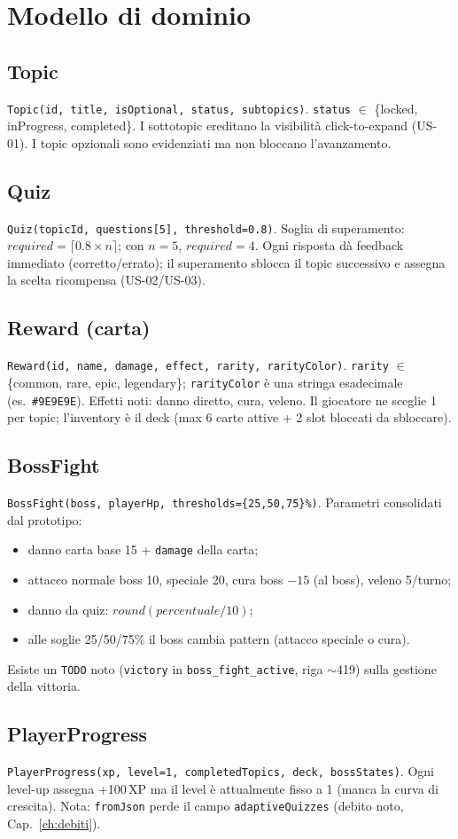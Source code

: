 \chapter{Modello di dominio}
\label{ch:dominio}

\section{Topic}
\texttt{Topic(id, title, isOptional, status, subtopics)}.
\texttt{status} $\in$ \{locked, inProgress, completed\}. I sottotopic ereditano
la visibilità click-to-expand (US-01). I topic opzionali sono evidenziati ma
non bloccano l'avanzamento.

\section{Quiz}
\texttt{Quiz(topicId, questions[5], threshold=0.8)}.
Soglia di superamento: $required = \lceil 0.8 \times n \rceil$; con $n=5$,
$required = 4$. Ogni risposta dà feedback immediato (corretto/errato);
il superamento sblocca il topic successivo e assegna la scelta ricompensa
(US-02/US-03).

\section{Reward (carta)}
\texttt{Reward(id, name, damage, effect, rarity, rarityColor)}.
\texttt{rarity} $\in$ \{common, rare, epic, legendary\}; \texttt{rarityColor}
è una stringa esadecimale (es.\ \texttt{\#9E9E9E}). Effetti noti: danno
diretto, cura, veleno. Il giocatore ne sceglie 1 per topic; l'inventory
è il deck (max 6 carte attive + 2 slot bloccati da sbloccare).

\section{BossFight}
\texttt{BossFight(boss, playerHp, thresholds=\{25,50,75\}\%)}.
Parametri consolidati dal prototipo:
\begin{itemize}[nosep]
\item danno carta base 15 + \texttt{damage} della carta;
\item attacco normale boss 10, speciale 20, cura boss $-15$ (al boss),
veleno 5/turno;
\item danno da quiz: $\mathit{round}(\mathit{percentuale}/10)$;
\item alle soglie 25/50/75\% il boss cambia pattern (attacco speciale o cura).
\end{itemize}
Esiste un \texttt{TODO} noto (\texttt{victory} in \texttt{boss\_fight\_active},
riga $\sim$419) sulla gestione della vittoria.

\section{PlayerProgress}
\texttt{PlayerProgress(xp, level=1, completedTopics, deck, bossStates)}.
Ogni level-up assegna +100\,XP ma il level è attualmente fisso a 1
(manca la curva di crescita). Nota: \texttt{fromJson} perde il campo
\texttt{adaptiveQuizzes} (debito noto, Cap.~\ref{ch:debiti}).
